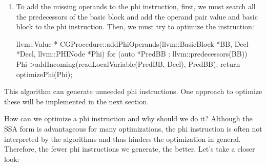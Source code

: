 \begin{enumerate}
\item
To add the missing operands to the phi instruction, first, we must search all the predecessors of the basic block and add the operand pair value and basic block to the phi instruction. Then, we must try to optimize the instruction:

\begin{cpp}
llvm::Value *
CGProcedure::addPhiOperands(llvm::BasicBlock *BB,
                            Decl *Decl,
                            llvm::PHINode *Phi) {
    for (auto *PredBB : llvm::predecessors(BB))
        Phi->addIncoming(readLocalVariable(PredBB, Decl),
                         PredBB);
    return optimizePhi(Phi);
}
\end{cpp}

\end{enumerate}

This algorithm can generate unneeded phi instructions. One approach to optimize these will be implemented in the next section.


How can we optimize a phi instruction and why should we do it? Although the SSA form is advantageous for many optimizations, the phi instruction is often not interpreted by the algorithms and thus hinders the optimization in general. Therefore, the fewer phi instructions we generate, the better. Let’s take a closer look:

